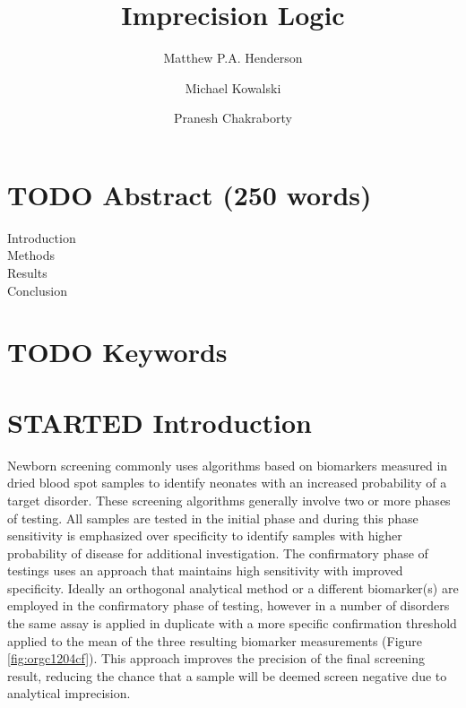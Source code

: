 \documentclass[review]{elsarticle}
\date{}
\title{}
\begin{document}
\makeatletter
\newcommand{\citeprocitem}[2]{\hyper@linkstart{cite}{citeproc_bib_item_#1}#2\hyper@linkend}
\makeatother



\begin{frontmatter}
\title{Imprecision Logic}
\author[NSO, UoO]{Matthew P.A. Henderson}
\author[NSO]{Michael Kowalski}
\author[NSO, UO]{Pranesh Chakraborty}
\address[NSO]{Newborn Screening Ontario, Children's Hospital of Eastern Ontario,Canada}
\address[UoO]{Department of Medicine, University of Ottawa,Canada} 
\end{frontmatter}

\section*{{\bfseries\sffamily TODO} Abstract (250 words)}
\label{sec:orge940973}
\begin{description}
\item[{Introduction}] 

\item[{Methods}] 

\item[{Results}] 

\item[{Conclusion}] 
\end{description}
\section*{{\bfseries\sffamily TODO} Keywords}
\label{sec:orgf2b93f1}
\section*{{\bfseries\sffamily STARTED} Introduction}
\label{sec:org126d545}

Newborn screening commonly uses algorithms based on biomarkers
measured in dried blood spot samples to identify neonates with an
increased probability of a target disorder. These screening algorithms
generally involve two or more phases of testing. All samples are
tested in the initial phase and during this phase sensitivity is
emphasized over specificity to identify samples with higher
probability of disease for additional investigation. The confirmatory
phase of testings uses an approach that maintains high sensitivity
with improved specificity. Ideally an orthogonal analytical method or
a different biomarker(s) are employed in the confirmatory phase of
testing, however in a number of disorders the same assay is applied in
duplicate with a more specific confirmation threshold applied to the
mean of the three resulting biomarker measurements (Figure
\ref{fig:orgc1204cf}). This approach improves the precision of the final
screening result, reducing the chance that a sample will be deemed
screen negative due to analytical imprecision.
\end{document}
